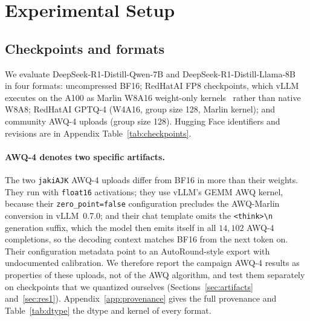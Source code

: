 \documentclass[11pt,a4paper]{article}
\begin{document}
\section{Experimental Setup}
\label{sec:setup}
\subsection{Checkpoints and formats}
\label{sec:setup-models}
We evaluate DeepSeek-R1-Distill-Qwen-7B and DeepSeek-R1-Distill-Llama-8B~\cite{guo2025deepseekr1} in four formats: uncompressed BF16; RedHatAI FP8 checkpoints, which vLLM executes on the A100 as Marlin W8A16 weight-only kernels~\cite{frantar2024marlin} rather than native W8A8; RedHatAI GPTQ-4 (W4A16, group size 128, Marlin kernel); and community AWQ-4 uploads (group size 128). Hugging Face identifiers and revisions are in Appendix Table~\ref{tab:checkpoints}.

\paragraph{AWQ-4 denotes two specific artifacts.} The two \texttt{jakiAJK} AWQ-4 uploads differ from BF16 in more than their weights. They run with \texttt{float16} activations; they use vLLM's GEMM AWQ kernel, because their \texttt{zero\_point=false} configuration precludes the AWQ-Marlin conversion in vLLM~0.7.0; and their chat template omits the \texttt{<think>\textbackslash n} generation suffix, which the model then emits itself in all $14{,}102$ AWQ-4 completions, so the decoding context matches BF16 from the next token on. Their configuration metadata point to an AutoRound-style export with undocumented calibration. We therefore report the campaign AWQ-4 results as properties of these uploads, not of the AWQ algorithm, and test them separately on checkpoints that we quantized ourselves (Sections~\ref{sec:artifacts} and~\ref{sec:res1}). Appendix~\ref{app:provenance} gives the full provenance and Table~\ref{tab:dtype} the dtype and kernel of every format.
\end{document}

